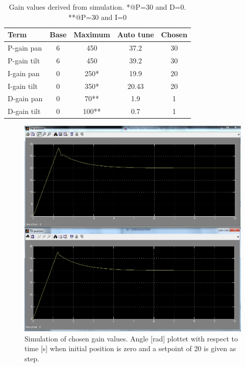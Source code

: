 \begin{table}[htb]				
	\begin{center}
	\begin{tabular}{l|c|c|c|c}			
	Term & Base & Maximum & Auto tune & Chosen \\			
	\hline												
P-gain pan& 6 & 450 & 37.2 & 30\\
P-gain tilt& 6 & 450 & 39.2 & 30\\
I-gain pan& 0 & 250* & 19.9  & 20\\
I-gain tilt& 0 & 350* & 20.43 & 20\\
D-gain pan& 0 & 70** & 1.9 & 1\\
D-gain tilt& 0 & 100** & 0.7 & 1\\
	\end{tabular}
	\end{center}
	\caption{Gain values derived from simulation. *@P=30 and D=0. **@P=30 and I=0}				
	\label{tab:gain_values}			
\end{table}

\begin{figure}[htb]
	\begin{center}
	\includegraphics[scale=1,trim=0 0 0 0]{graphics/screensh_pid.jpg} %
	\caption{Simulation of chosen gain values. Angle [rad] plottet with respect to time [s] when initial position is zero and a setpoint of 20 is given as step.}
	\label{fig:chosen_plot}			%
	\end{center}
\end{figure}

